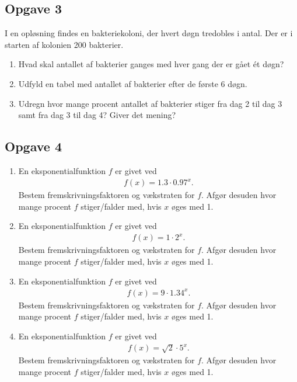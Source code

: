 \subsection*{Opgave 3}

I en opløsning findes en bakteriekoloni, der hvert døgn tredobles i antal. Der er i starten af kolonien 200 bakterier.

\begin{enumerate}[label=\roman*)]
	\item Hvad skal antallet af bakterier ganges med hver gang der er gået ét døgn?
	\item Udfyld en tabel med antallet af bakterier efter de første 6 døgn.
	\item Udregn hvor mange procent antallet af bakterier stiger fra dag 2 til dag 3 samt fra 
	dag 3 til dag 4? Giver det mening?
\end{enumerate} 




\subsection*{Opgave 4}



\begin{enumerate}[label=\roman*)]
	\item En eksponentialfunktion $f$ er givet ved
	\begin{align*}
		f(x) = 1.3\cdot 0.97^x.
	\end{align*}
	Bestem fremskrivningsfaktoren og vækstraten for $f$. Afgør desuden hvor mange procent $f$ stiger/falder med, hvis $x$ øges med 1.
	\item En eksponentialfunktion $f$ er givet ved
	\begin{align*}
		f(x) = 1\cdot 2^x.
	\end{align*}
	Bestem fremskrivningsfaktoren og vækstraten for $f$. Afgør desuden hvor mange procent $f$ stiger/falder med, hvis $x$ øges med 1.
	\item En eksponentialfunktion $f$ er givet ved
	\begin{align*}
		f(x) = 9\cdot 1.34^x.
	\end{align*}
	Bestem fremskrivningsfaktoren og vækstraten for $f$. Afgør desuden hvor mange procent $f$ stiger/falder med, hvis $x$ øges med 1.
	\item En eksponentialfunktion $f$ er givet ved
	\begin{align*}
		f(x) = \sqrt{2}\cdot 5^x.
	\end{align*}
	Bestem fremskrivningsfaktoren og vækstraten for $f$. Afgør desuden hvor mange procent $f$ stiger/falder med, hvis $x$ øges med 1.
\end{enumerate}

